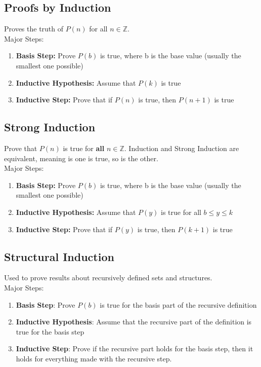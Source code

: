 \documentclass[letter]{article}
\begin{document}
\begin{multicols}{2}
  \section{Proofs by Induction}\noindent
  Proves the truth of $P(n)$ for all $n \in \mathbb{Z}$.\\
  Major Steps:
  \begin{enumerate}[noitemsep]
    \item \textbf{Basis Step:} Prove $P(b)$ is true, where b is the base value
          (usually the smallest one possible)
    \item \textbf{Inductive Hypothesis:} Assume that $P(k)$ is true
    \item \textbf{Inductive Step:} Prove that if $P(n)$ is true, then $P(n + 1)$
          is true
  \end{enumerate}

  \subsection{Strong Induction}\noindent
  Prove that $P(n)$ is true for \textbf{all} $n \in \mathbb{Z}$. Induction and
  Strong Induction are equivalent, meaning is one is true, so is the other. \\
  Major Steps:
  \begin{enumerate}[noitemsep]
    \item \textbf{Basis Step:} Prove $P(b)$ is true, where b is the base value
          (usually the smallest one possible)
    \item \textbf{Inductive Hypothesis:} Assume that $P(y)$ is true for all
          $b \leq y \leq k$
    \item \textbf{Inductive Step:} Prove that if $P(y)$ is true, then $P(k + 1)$
          is true
  \end{enumerate}

  \subsection{Structural Induction}\noindent
  Used to prove results about recursively defined sets and structures. \\
  Major Steps:
  \begin{enumerate}[noitemsep]
    \item \textbf{Basis Step}: Prove $P(b)$ is true for the basis part of the
          recursive definition
    \item \textbf{Inductive Hypothesis}: Assume that the recursive part of the
          definition is true for the basis step
    \item \textbf{Inductive Step}: Prove if the recursive part holds for the
          basis step, then it holds for everything made with the recursive step.
  \end{enumerate}


\end{multicols}
\end{document}
